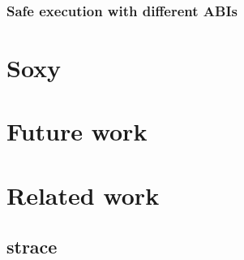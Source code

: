 \documentclass[a4paper, twoside, 10pt, twocolumn]{report}
\begin{document}

\subsection{Safe execution with different ABIs}

%

\chapter{Soxy}

\chapter{Future work}


\chapter{Related work}

\section{strace}

\end{document}
